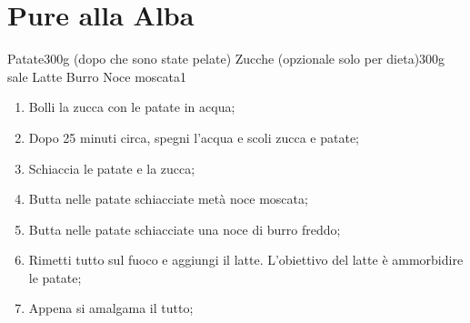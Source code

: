 \section{Pure alla Alba}

\generalRecipeInfos{}

\ingredienti%
    {Patate}{300g (dopo che sono state pelate)}%
    {Zucche (opzionale solo per dieta)}{300g}%
    {sale}{\qb{}}%
    {Latte}{\qb{}}%
    {Burro}{\qb{}}%
    {Noce moscata}{1}%
    

\begin{enumerate}
    \item Bolli la zucca con le patate in acqua;
    \item Dopo 25 minuti circa, spegni l'acqua e scoli zucca e patate;
    \item Schiaccia le patate e la zucca;
    \item Butta nelle patate schiacciate metà noce moscata;
    \item Butta nelle patate schiacciate una noce di burro freddo;
    \item Rimetti tutto sul fuoco e aggiungi il latte. L'obiettivo del latte è ammorbidire le patate;
    \item Appena si amalgama il tutto;
    
\end{enumerate}

